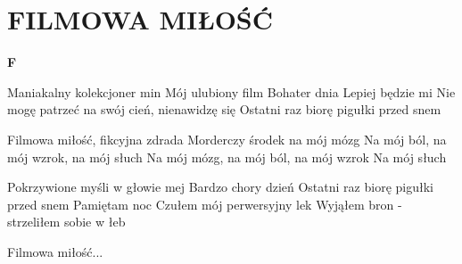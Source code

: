 \documentclass[../../../songbook.tex]{subfiles}
\begin{document}
\TabPositions{8cm} %
\section*{FILMOWA MIŁOŚĆ}
{}
\vspace{0.5cm}
{\color{red}\textbf{F} } \newline

Maniakalny kolekcjoner min \newline
Mój ulubiony film \newline
Bohater dnia  \newline
Lepiej będzie mi \newline
Nie mogę patrzeć na swój cień, nienawidzę się \newline
Ostatni raz biorę pigułki przed snem \newline

\-\hspace{1cm} Filmowa miłość, fikcyjna zdrada \newline
\-\hspace{1cm} Morderczy środek na mój mózg \newline
\-\hspace{1cm} Na mój ból, na mój wzrok, na mój słuch  \newline
\-\hspace{1cm} Na mój mózg, na mój ból, na mój wzrok  \newline
\-\hspace{1cm} Na mój słuch  \newline

Pokrzywione myśli w głowie mej \newline
Bardzo chory dzień \newline
Ostatni raz biorę pigułki przed snem \newline
Pamiętam noc \newline
Czułem mój perwersyjny lek \newline
Wyjąłem bron - strzeliłem sobie w łeb \newline

\-\hspace{1cm} Filmowa miłość... \newline
\end{document}
